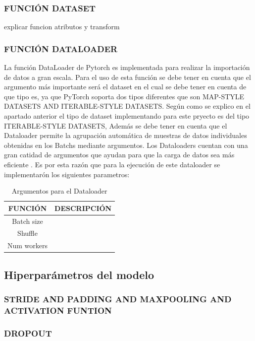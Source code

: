 			\subsubsection{\MakeUppercase{Función Dataset}}
			explicar funcion atributos y transform
			\subsubsection{\MakeUppercase{Función Dataloader}}
			La función DataLoader de Pytorch es implementada para realizar la importación de datos a gran escala. Para el uso de esta función se debe tener en cuenta que el argumento más importante será el dataset en el cual se debe tener en cuenta de que tipo es, ya que PyTorch soporta dos tipos diferentes que son MAP-STYLE DATASETS AND ITERABLE-STYLE DATASETS. 
			Según como se explico en el apartado anterior el tipo de dataset implementando para este pryecto es del tipo ITERABLE-STYLE DATASETS, Además se debe tener en cuenta que el Dataloader permite la agrupación automática de muestras de datos individuales obtenidas en los Batchs mediante argumentos. 
			Los Dataloaders cuentan con una gran catidad de argumentos que ayudan para que la carga de datos sea más eficiente \cite{Pytorch}. Es por esta razón que para la ejecución de este dataloader se implementarón los siguientes parametros:
			
			\begin{table}[ht]
				\centering
				\begin{tabular}{|c|c|}
					\hline
					FUNCIÓN & DESCRIPCIÓN \\ 
					\hline
					Batch size & \\
					\hline
					Shuffle & \\
					\hline
					Num workers & \\
					\hline
				\end{tabular}	
				\caption{Argumentos para el Dataloader}
				\label{table:Argumentos}
			\end{table}
			
		
		\subsection{Hiperparámetros del modelo}
			\subsubsection{\MakeUppercase{Stride and Padding and maxpooling and activation funtion}}
			\subsubsection{\MakeUppercase{Dropout}}
